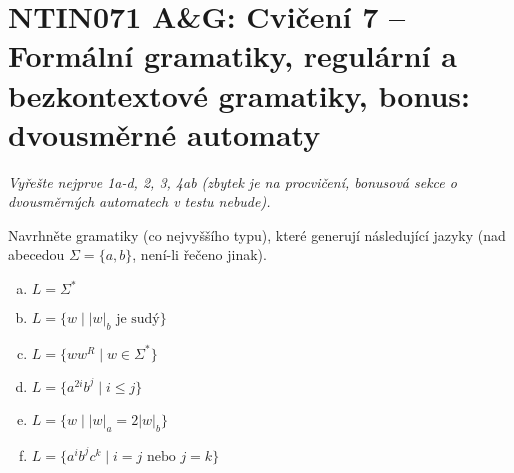 \documentclass[a4paper,12pt]{amsart}
\begin{document}
\thispagestyle{empty}

\section*{NTIN071 A\&G: Cvičení 7 -- Formální gramatiky, regulární a bezkontextové gramatiky, bonus: dvousměrné automaty}


\medskip

\noindent\emph{Vyřešte nejprve 1a-d, 2, 3, 4ab (zbytek je na procvičení, bonusová sekce o dvousměrných automatech v testu nebude).}

\medskip


\medskip\begin{problem}

    Navrhněte gramatiky (co nejvyššího typu), které generují následující jazyky (nad abecedou $\Sigma=\{a,b\}$, není-li řečeno jinak).

    \begin{multicols}{2}
    \begin{enumerate}[(a)]    
        \item $L=\Sigma^*$
        \item $L=\{w\mid |w|_b\text{ je sudý}\} $
        \item $L=\{ww^R\mid w\in \Sigma^*\} $
        \item $L=\{a^{2i}b^j\mid i\leq j\}$
        \item $L=\{w\mid |w|_a = 2|w|_b\}$
        \item $L = \{a^ib^jc^k\mid i = j\text{ nebo }j = k\}$
    
    \end{enumerate}
    \end{multicols}

\end{problem}
\end{document}

